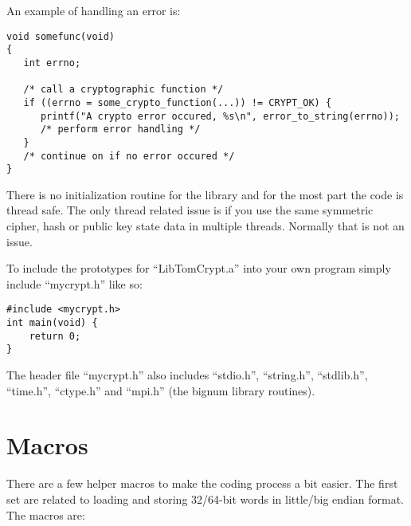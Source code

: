 \documentclass{book}
\begin{document}
An example of handling an error is:
\begin{verbatim}
void somefunc(void)
{
   int errno;
   
   /* call a cryptographic function */
   if ((errno = some_crypto_function(...)) != CRYPT_OK) {
      printf("A crypto error occured, %s\n", error_to_string(errno));
      /* perform error handling */
   }
   /* continue on if no error occured */
}
\end{verbatim}

There is no initialization routine for the library and for the most part the code is thread safe.  The only thread
related issue is if you use the same symmetric cipher, hash or public key state data in multiple threads.  Normally
that is not an issue.

To include the prototypes for ``LibTomCrypt.a'' into your own program simply include ``mycrypt.h'' like so:
\begin{verbatim}
#include <mycrypt.h>
int main(void) {
    return 0;
}
\end{verbatim}

The header file ``mycrypt.h'' also includes ``stdio.h'', ``string.h'', ``stdlib.h'', ``time.h'', ``ctype.h'' and ``mpi.h''
(the bignum library routines).

\section{Macros}

There are a few helper macros to make the coding process a bit easier.  The first set are related to loading and storing
32/64-bit words in little/big endian format.  The macros are:
\end{document}
